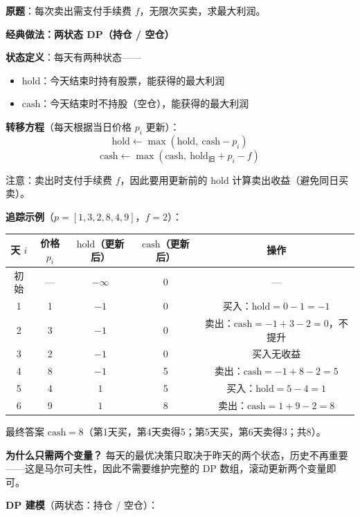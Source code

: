 \documentclass[12pt, a4paper]{ctexart}
\begin{document}
\begin{blackboard}

\textbf{原题}：每次卖出需支付手续费 $f$，无限次买卖，求最大利润。

\textbf{经典做法：两状态 DP（持仓 / 空仓）}

\textbf{状态定义}：每天有两种状态——
\begin{itemize}
    \item $\text{hold}$：今天结束时持有股票，能获得的最大利润
    \item $\text{cash}$：今天结束时不持股（空仓），能获得的最大利润
\end{itemize}

\textbf{转移方程}（每天根据当日价格 $p_i$ 更新）：
$$\text{hold} \leftarrow \max(\text{hold},\ \text{cash} - p_i)$$
$$\text{cash} \leftarrow \max(\text{cash},\ \text{hold}_{\text{旧}} + p_i - f)$$

注意：卖出时支付手续费 $f$，因此要用更新前的 $\text{hold}$ 计算卖出收益（避免同日买卖）。

\textbf{追踪示例}（$p = [1, 3, 2, 8, 4, 9]$，$f = 2$）：

\begin{center}
\begin{tabular}{ccccc}
\toprule
天 $i$ & 价格 $p_i$ & $\text{hold}$（更新后） & $\text{cash}$（更新后） & 操作 \\
\midrule
初始 & — & $-\infty$ & 0 & — \\
1 & 1 & $-1$ & 0 & 买入：$\text{hold}=0-1=-1$ \\
2 & 3 & $-1$ & 0 & 卖出：$\text{cash}=-1+3-2=0$，不提升 \\
3 & 2 & $-1$ & 0 & 买入无收益 \\
4 & 8 & $-1$ & 5 & 卖出：$\text{cash}=-1+8-2=5$ \\
5 & 4 & $1$ & 5 & 买入：$\text{hold}=5-4=1$ \\
6 & 9 & $1$ & 8 & 卖出：$\text{cash}=1+9-2=8$ \\
\bottomrule
\end{tabular}
\end{center}

最终答案 $\text{cash} = 8$（第1天买，第4天卖得5；第5天买，第6天卖得3；共8）。

\textbf{为什么只需两个变量？} 每天的最优决策只取决于昨天的两个状态，历史不再重要——这是马尔可夫性，因此不需要维护完整的 DP 数组，滚动更新两个变量即可。

\textbf{DP 建模}（两状态：持仓 / 空仓）：


\end{blackboard}
\end{document}
